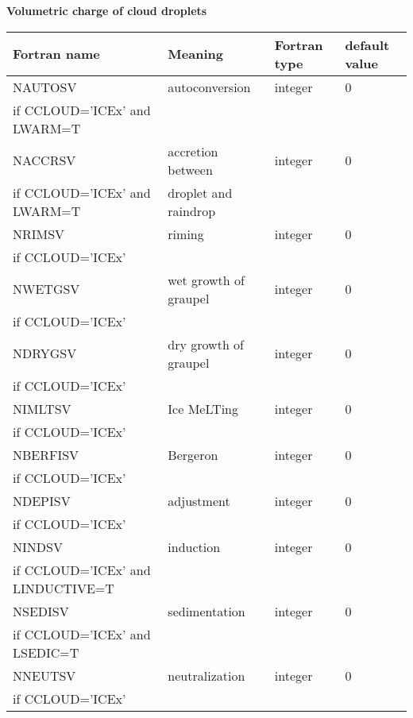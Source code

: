 \textbf{Volumetric charge of cloud droplets}
\begin{longtable} {|p{}|p{}|>{\centering}p{}|p{}<{\centering}|}
\hline
Fortran name & Meaning & Fortran type & default value \\
\hline \hline
\endhead
NAUTOSV & autoconversion & integer & 0 \\ \nopagebreak
if CCLOUD='ICEx' and LWARM=T &&& \\\hline

NACCRSV & accretion between  & integer & 0 \\ \nopagebreak
if CCLOUD='ICEx' and LWARM=T &droplet and raindrop&& \\\hline

NRIMSV & riming & integer & 0 \\ \nopagebreak
if CCLOUD='ICEx' &&& \\\hline

NWETGSV & wet growth of graupel & integer & 0 \\ \nopagebreak
if CCLOUD='ICEx' &&& \\\hline

NDRYGSV & dry growth of graupel & integer & 0 \\ \nopagebreak
if CCLOUD='ICEx' &&& \\\hline

NIMLTSV & Ice MeLTing & integer & 0 \\ \nopagebreak
if CCLOUD='ICEx' &&& \\\hline

NBERFISV & Bergeron & integer & 0 \\ \nopagebreak
if CCLOUD='ICEx' &&& \\\hline

NDEPISV & adjustment& integer & 0 \\ \nopagebreak
if CCLOUD='ICEx' &&& \\\hline

NINDSV & induction & integer & 0 \\ \nopagebreak
if CCLOUD='ICEx' and LINDUCTIVE=T &&& \\\hline

NSEDISV & sedimentation& integer & 0 \\ \nopagebreak
if CCLOUD='ICEx' and LSEDIC=T &&& \\\hline

NNEUTSV & neutralization & integer & 0 \\ \nopagebreak
if CCLOUD='ICEx' &&& \\\hline
\end{longtable}

